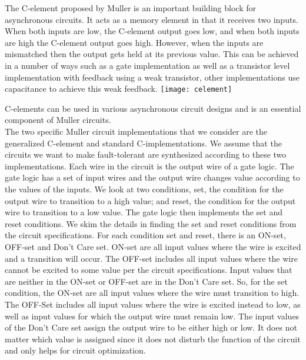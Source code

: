 \documentclass[12pt]{report}
\begin{document}
The C-element proposed by Muller is an important building block for asynchronous circuits. It acts as a memory element in that it receives two inputs. When both inputs are low, the C-element output goes low, and when both inputs are high the C-element output goes high. However, when the inputs are mismatched then the output gets held at its previous value. This can be achieved in a number of ways such as a gate implementation as well as a transistor level implementation with feedback using a weak transistor, other implementations use capacitance to achieve this weak feedback.
\texttt{[image: celement]}

C-elements can be used in various asynchronous circuit designs and is an essential component of Muller circuits. \\

The two specific Muller circuit implementations that we consider are the generalized C-element and standard C-implementations. We assume that the circuits we want to make fault-tolerant are synthesized according to these two implementations. 
Each wire in the circuit is the output wire of a gate logic. The gate logic has a set of input wires and the output wire changes value according to the values of the inputs. We look at two conditions, set, the condition for the output wire to transition to a high value; and reset, the condition for the output wire to transition to a low value. The gate logic then implements the set and reset conditions. 
We skim the details in finding the set and reset conditions from the circuit specifications. For each condition set and reset, there is an ON-set, OFF-set and Don't Care set. ON-set are all input values where the wire is excited and a transition will occur. The OFF-set includes all input values where the wire cannot be excited to some value per the circuit specifications. Input values that are neither in the ON-set or OFF-set are in the Don't Care set. So, for the set condition, the ON-set are all input values where the wire must transition to high. The OFF-Set includes all input values where the wire is excited instead to low, as well as input values for which the output wire must remain low. The input values of the Don't Care set assign the output wire to be either high or low. It does not matter which value is assigned since it does not disturb the function of the circuit and only helps for circuit optimization. \\
\end{document}
